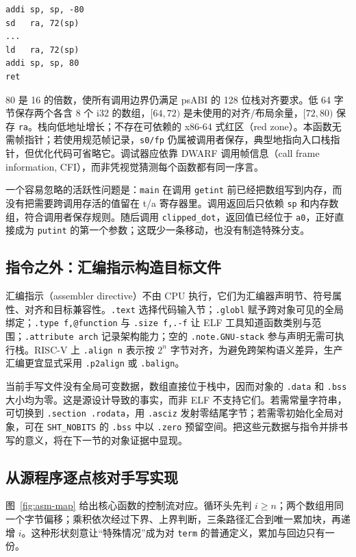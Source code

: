 \begin{verbatim}
addi sp, sp, -80
sd   ra, 72(sp)
...
ld   ra, 72(sp)
addi sp, sp, 80
ret
\end{verbatim}

80 是 16 的倍数，使所有调用边界仍满足 psABI 的 128 位栈对齐要求。低 64 字节保存两个各含 8 个 i32 的数组，\([64,72)\) 是未使用的对齐/布局余量，\([72,80)\) 保存 \texttt{ra}。栈向低地址增长；不存在可依赖的 x86-64 式红区（red zone）。本函数无需帧指针；若使用规范帧记录，\texttt{s0/fp} 仍属被调用者保存，典型地指向入口栈指针，但优化代码可省略它。调试器应依靠 DWARF 调用帧信息（call frame information, CFI），而非凭视觉猜测每个函数都有同一序言。

一个容易忽略的活跃性问题是：\texttt{main} 在调用 \texttt{getint} 前已经把数组写到内存，而没有把需要跨调用存活的值留在 t/a 寄存器里。调用返回后只依赖 \texttt{sp} 和内存数组，符合调用者保存规则。随后调用 \texttt{clipped\_dot}，返回值已经位于 \texttt{a0}，正好直接成为 \texttt{putint} 的第一个参数；这既少一条移动，也没有制造特殊分支。

\subsection{指令之外：汇编指示构造目标文件}

汇编指示（assembler directive）不由 CPU 执行，它们为汇编器声明节、符号属性、对齐和目标兼容性。\texttt{.text} 选择代码输入节；\texttt{.globl} 赋予跨对象可见的全局绑定；\texttt{.type f,@function} 与 \texttt{.size f,.-f} 让 ELF 工具知道函数类别与范围；\texttt{.attribute arch} 记录架构能力；空的 \texttt{.note.GNU-stack} 参与声明无需可执行栈。RISC-V 上 \texttt{.align n} 表示按 \(2^n\) 字节对齐，为避免跨架构语义差异，生产汇编更宜显式采用 \texttt{.p2align} 或 \texttt{.balign}\cite{bin-riscv-asm}。

当前手写文件没有全局可变数据，数组直接位于栈中，因而对象的 \texttt{.data} 和 \texttt{.bss} 大小均为零。这是源设计导致的事实，而非 ELF 不支持它们。若需常量字符串，可切换到 \texttt{.section .rodata}，用 \texttt{.asciz} 发射零结尾字节；若需零初始化全局对象，可在 \texttt{SHT\_NOBITS} 的 \texttt{.bss} 中以 \texttt{.zero} 预留空间。把这些元数据与指令并排书写的意义，将在下一节的对象证据中显现。

\subsection{从源程序逐点核对手写实现}

图~\ref{fig:asm-map} 给出核心函数的控制流对应。循环头先判 \(i\ge n\)；两个数组用同一个字节偏移；乘积依次经过下界、上界判断，三条路径汇合到唯一累加块，再递增 \(i\)。这种形状刻意让“特殊情况”成为对 \texttt{term} 的普通定义，累加与回边只有一份。

